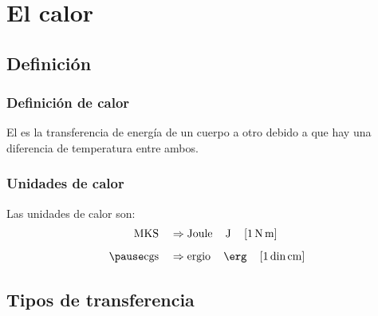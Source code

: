 \documentclass[14pt]{beamer}
\begin{document}
\section{El calor}
\subsection{Definición}

\begin{frame}
\frametitle{Definición de calor}
El  es la transferencia de energía de un cuerpo a otro debido a que hay una
diferencia de temperatura entre ambos.
\end{frame}
\begin{frame}
\frametitle{Unidades de calor}
Las unidades de calor son:
\pause
\begin{eqnarray*}
\begin{aligned}
\text{MKS} \quad &\Rightarrow \text{Joule} \, \quad \unit{\joule}  \quad \left[ \SI{1}{\newton\metre} \right] \\[0.5em] \pause
\text{cgs} \quad &\Rightarrow \text{ergio} \, \quad \unit{\erg} \quad \left[ 1 \, \text{din} \, \unit{\centi\metre} \right]
\end{aligned}
\end{eqnarray*}
\end{frame}

\subsection{Tipos de transferencia}
\end{document}
